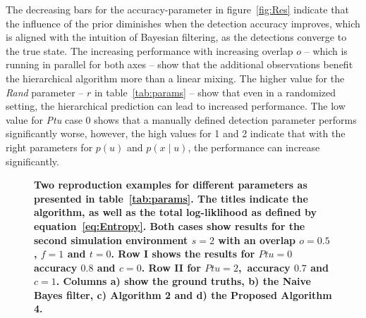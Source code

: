 \documentclass[twocolumn,letterpaper]{IEEEAerospaceCLS}  %
\begin{document}
The decreasing bars for the accuracy-parameter in figure~\ref{fig:Res} indicate that the influence of the prior diminishes when the detection accuracy improves, which is aligned with the intuition of Bayesian filtering, as the detections converge to the true state. The increasing performance with increasing overlap $o$ -- which is running in parallel for both axes -- show that the additional observations benefit the hierarchical algorithm more than a linear mixing. The higher value for the \emph{Rand} parameter -- $r$ in table~\ref{tab:params} -- show that even in a randomized setting, the hierarchical prediction can lead to increased performance. The low value for \emph{Ptu} case 0 shows that a manually defined detection parameter performs significantly worse, however, the high values for 1 and 2 indicate that with the right parameters for $p(u)$ and $p(x\mid u)$, the performance can increase significantly.
\begin{figure}
    \centering
    \caption{\bf{
        Two reproduction examples for different parameters as presented in table~\ref{tab:params}. The titles indicate the algorithm, as well as the total log-liklihood as defined by equation~\ref{eq:Entropy}. Both cases show results for the second simulation environment $s=2$ with an overlap $o=0.5$, $f=1$ and $t=0$. Row I shows the results for $Ptu=0$ accuracy $0.8$ and $c=0$. Row II for $Ptu=2$,~accuracy $0.7$ and $c=1$. Columns a) show the ground truths, b) the Naive Bayes filter, c) Algorithm 2 and d) the Proposed Algorithm 4. 
    }}
    \label{fig:SampRes}
\end{figure}
\end{document}
